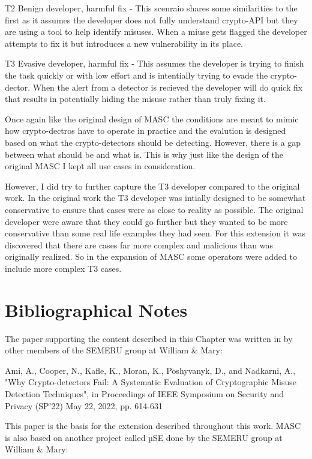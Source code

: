 T2 Benign developer, harmful fix - This scenraio shares some similarities to the first as it assumes the developer does not fully understand crypto-API but they are using a tool to help identify misuses. When a miuse gets flagged the developer attempts to fix it but introduces a new vulnerability in its place.

T3 Evasive developer, harmful fix - This assumes the developer is trying to finish the task quickly or with low effort and is intentially trying to evade the crypto-dector. When the alert from a detector is recieved the developer will do quick fix that results in potentially hiding the misuse rather than truly fixing it.

Once again like the original design of MASC the conditions are meant to mimic how crypto-dectros have to operate in practice and the evalution is designed based on what the crypto-detectors should be detecting. However, there is a gap between what should be and what is. This is why just like the design of the original MASC I kept all use cases in consideration. 

However, I did try to further capture the T3 developer compared to the original work. In the original work the T3 developer was intially designed to be somewhat conservative to ensure that cases were as close to reality as possible. The original developer were aware that they could go further but they wanted to be more conservative than some real life examples they had seen. For this extension it was discovered that there are cases far more complex and malicious than was originally realized. So in the expansion of MASC some operators were added to include more complex T3 cases.


\section{Bibliographical Notes}
\label{ch1:sec:bibliographicalNotes}

The paper supporting the content described in this Chapter was written in by other members of the SEMERU group at William \& Mary:

Ami, A., Cooper, N., Kafle, K., Moran, K., Poshyvanyk, D., and Nadkarni, A., "Why Crypto-detectors Fail: A Systematic Evaluation of Cryptographic Misuse Detection Techniques", in Proceedings of IEEE Symposium on Security and Privacy (SP'22) May 22, 2022, pp. 614-631

This paper is the basis for the extension described throughout this work. MASC is also based on another project called µSE done by the SEMERU group at William \& Mary:

